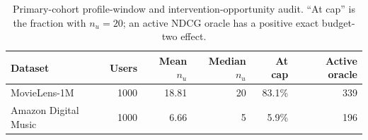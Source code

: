 \begin{table}[t]
\centering\small
\caption{Primary-cohort profile-window and intervention-opportunity audit. ``At cap'' is the fraction with $n_u=20$; an active NDCG oracle has a positive exact budget-two effect.}
\label{tab:profile-window-audit}
\begin{tabular}{lrrrrr}
\toprule
Dataset & Users & Mean $n_u$ & Median $n_u$ & At cap & Active oracle \\
\midrule
MovieLens-1M & 1000 & 18.81 & 20 & 83.1\% & 339 \\
Amazon Digital Music & 1000 & 6.66 & 5 & 5.9\% & 196 \\
\bottomrule
\end{tabular}
\end{table}